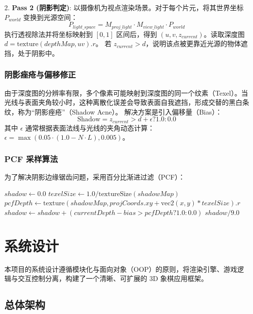 \documentclass[a4paper]{article}
\begin{document}
2. \textbf{Pass 2 (阴影判定)}: 
   以摄像机为视点渲染场景。对于每个片元，将其世界坐标 $P_{world}$ 变换到光源空间：
   \begin{equation}
   P_{light\_space} = M_{proj\_light} \cdot M_{view\_light} \cdot P_{world}
   \end{equation}
   执行透视除法并将坐标映射到 $[0, 1]$ 区间后，得到 $(u, v, z_{current})$。读取深度图 $d = \text{texture}(depthMap, uv).r$。
   若 $z_{current} > d$，说明该点被更靠近光源的物体遮挡，处于阴影中。

\subsubsection{阴影痤疮与偏移修正}
由于深度图的分辨率有限，多个像素可能映射到深度图的同一个纹素（Texel）。当光线与表面夹角较小时，这种离散化误差会导致表面自我遮挡，形成交替的黑白条纹，称为“阴影痤疮”（Shadow Acne）。
解决方案是引入偏移量（Bias）：
\begin{equation}
\text{Shadow} = z_{current} > d + \epsilon ? 1.0 : 0.0
\end{equation}
其中 $\epsilon$ 通常根据表面法线与光线的夹角动态计算：$\epsilon = \max(0.05 \cdot (1.0 - N \cdot L), 0.005)$。

\subsubsection{PCF 采样算法}
为了解决阴影边缘锯齿问题，采用百分比渐进过滤（PCF）：
\begin{algorithm}[H]
\caption{PCF (3x3 Kernel)}
\begin{algorithmic}
\STATE $shadow \leftarrow 0.0$
\STATE $texelSize \leftarrow 1.0 / \text{textureSize}(shadowMap)$
        \STATE $pcfDepth \leftarrow \text{texture}(shadowMap, projCoords.xy + \text{vec2}(x, y) * texelSize).r$
        \STATE $shadow \leftarrow shadow + (currentDepth - bias > pcfDepth ? 1.0 : 0.0)$
    \ENDFOR
\ENDFOR
\RETURN $shadow / 9.0$
\end{algorithmic}
\end{algorithm}

\section{系统设计}

本项目的系统设计遵循模块化与面向对象（OOP）的原则，将渲染引擎、游戏逻辑与交互控制分离，构建了一个清晰、可扩展的 3D 象棋应用框架。

\subsection{总体架构}
\end{document}
